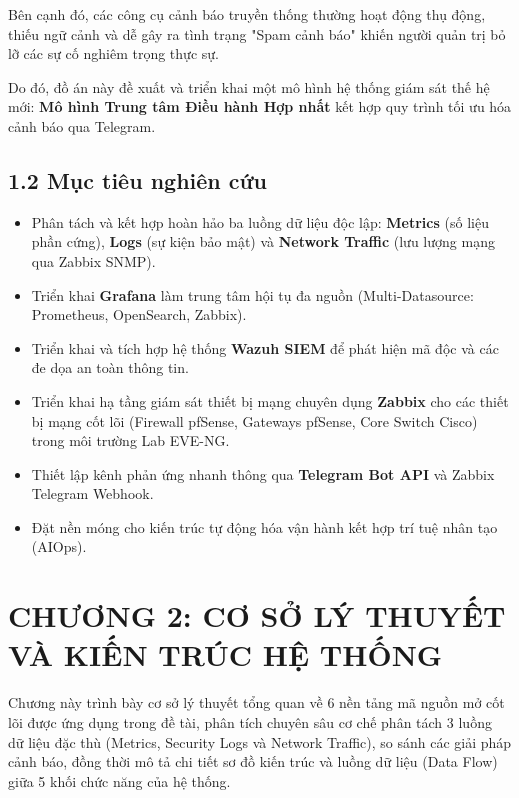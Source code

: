\documentclass[13pt,a4paper]{extarticle}
\begin{document}
Bên cạnh đó, các công cụ cảnh báo truyền thống thường hoạt động thụ động, thiếu ngữ cảnh và dễ gây ra tình trạng "Spam cảnh báo" khiến người quản trị bỏ lỡ các sự cố nghiêm trọng thực sự.

Do đó, đồ án này đề xuất và triển khai một mô hình hệ thống giám sát thế hệ mới: \textbf{Mô hình Trung tâm Điều hành Hợp nhất} kết hợp quy trình tối ưu hóa cảnh báo qua Telegram.

\subsection{1.2 Mục tiêu nghiên cứu}
\begin{itemize}
    \item Phân tách và kết hợp hoàn hảo ba luồng dữ liệu độc lập: \textbf{Metrics} (số liệu phần cứng), \textbf{Logs} (sự kiện bảo mật) và \textbf{Network Traffic} (lưu lượng mạng qua Zabbix SNMP).
    \item Triển khai \textbf{Grafana} làm trung tâm hội tụ đa nguồn (Multi-Datasource: Prometheus, OpenSearch, Zabbix).
    \item Triển khai và tích hợp hệ thống \textbf{Wazuh SIEM} để phát hiện mã độc và các đe dọa an toàn thông tin.
    \item Triển khai hạ tầng giám sát thiết bị mạng chuyên dụng \textbf{Zabbix} cho các thiết bị mạng cốt lõi (Firewall pfSense, Gateways pfSense, Core Switch Cisco) trong môi trường Lab EVE-NG.
    \item Thiết lập kênh phản ứng nhanh thông qua \textbf{Telegram Bot API} và Zabbix Telegram Webhook.
    \item Đặt nền móng cho kiến trúc tự động hóa vận hành kết hợp trí tuệ nhân tạo (AIOps).
\end{itemize}

\section{CHƯƠNG 2: CƠ SỞ LÝ THUYẾT VÀ KIẾN TRÚC HỆ THỐNG}

Chương này trình bày cơ sở lý thuyết tổng quan về 6 nền tảng mã nguồn mở cốt lõi được ứng dụng trong đề tài, phân tích chuyên sâu cơ chế phân tách 3 luồng dữ liệu đặc thù (Metrics, Security Logs và Network Traffic), so sánh các giải pháp cảnh báo, đồng thời mô tả chi tiết sơ đồ kiến trúc và luồng dữ liệu (Data Flow) giữa 5 khối chức năng của hệ thống.
\end{document}
